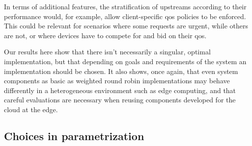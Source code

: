 In terms of additional features, the stratification of upstreams according to their performance would, for example, allow client-specific \gls{qos} policies to be enforced.
This could be relevant for scenarios where some requests are urgent, while others are not, or where devices have to compete for and bid on their \gls{qos}.

Our results here show that there isn't necessarily a singular, optimal implementation, but that depending on goals and requirements of the system an implementation should be chosen.
It also shows, once again, that even system components as basic as weighted round robin implementations may behave differently in a heterogeneous environment such as edge computing, and that careful evaluations are necessary when reusing components developed for the cloud at the edge.

\subsection{Choices in parametrization}

